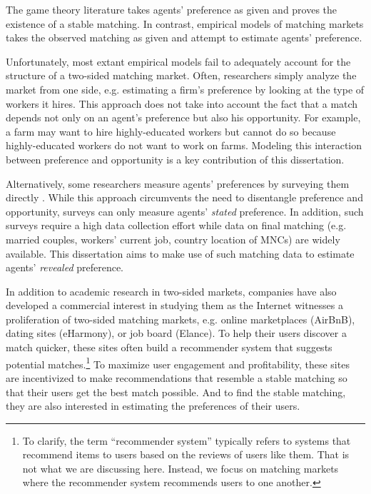 The game theory literature takes agents' preference as given and proves the
existence of a stable matching. In contrast, empirical models of matching
markets takes the observed matching as given and attempt to estimate agents'
preference.

Unfortunately, most extant empirical models fail to adequately account for the
structure of a two-sided matching market. Often, researchers simply analyze the
market from one side, e.g. estimating a firm's preference by looking at the type
of workers it hires. This approach does not take into account the fact that a
match depends not only on an agent's preference but also his opportunity. For
example, a farm may want to hire highly-educated workers but cannot do so
because highly-educated workers do not want to work on farms. Modeling this
interaction between preference and opportunity is a key contribution of this
dissertation.

Alternatively, some researchers measure agents' preferences by surveying them
directly \citep{Posner2001, Sprecher1994}. While this approach circumvents the
need to disentangle preference and opportunity, surveys can only measure agents'
\textit{stated} preference. In addition, such surveys require a high data
collection effort while data on final matching (e.g. married couples, workers'
current job, country location of MNCs) are widely available. This dissertation
aims to make use of such matching data to estimate agents' \textit{revealed}
preference.

In addition to academic research in two-sided markets, companies have also
developed a commercial interest in studying them as the Internet witnesses a
proliferation of two-sided matching markets, e.g. online marketplaces (AirBnB),
dating sites (eHarmony), or job board (Elance). To help their users discover a
match quicker, these sites often build a recommender system that suggests
potential matches.\footnote{To clarify, the term ``recommender system''
  typically refers to systems that recommend items to users based on the reviews
  of users like them. That is not what we are discussing here. Instead, we focus
  on matching markets where the recommender system recommends users to one
  another.} To maximize user engagement and profitability, these sites are
incentivized to make recommendations that resemble a stable matching so that
their users get the best match possible. And to find the stable matching, they
are also interested in estimating the preferences of their users.

